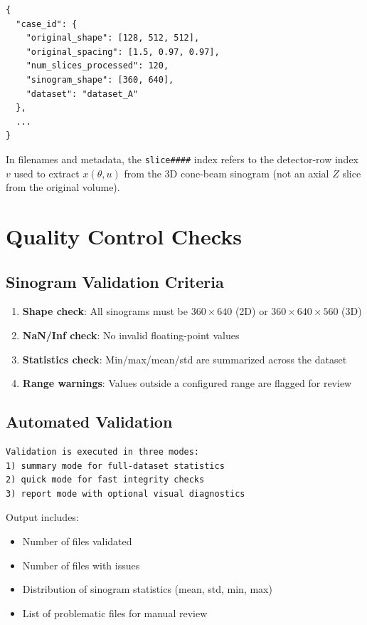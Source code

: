 \begin{verbatim}
{
  "case_id": {
    "original_shape": [128, 512, 512],
    "original_spacing": [1.5, 0.97, 0.97],
    "num_slices_processed": 120,
    "sinogram_shape": [360, 640],
    "dataset": "dataset_A"
  },
  ...
}
\end{verbatim}

In filenames and metadata, the \texttt{slice\#\#\#\#} index refers to the detector-row
index $v$ used to extract $x(\theta, u)$ from the 3D cone-beam sinogram (not an
axial $Z$ slice from the original volume).

\section{Quality Control Checks}

\subsection{Sinogram Validation Criteria}

\begin{enumerate}
    \item \textbf{Shape check}: All sinograms must be $360 \times 640$ (2D) or $360 \times 640 \times 560$ (3D)
    \item \textbf{NaN/Inf check}: No invalid floating-point values
    \item \textbf{Statistics check}: Min/max/mean/std are summarized across the dataset
    \item \textbf{Range warnings}: Values outside a configured range are flagged for review
\end{enumerate}

\subsection{Automated Validation}

\begin{verbatim}
Validation is executed in three modes:
1) summary mode for full-dataset statistics
2) quick mode for fast integrity checks
3) report mode with optional visual diagnostics
\end{verbatim}

Output includes:
\begin{itemize}
    \item Number of files validated
    \item Number of files with issues
    \item Distribution of sinogram statistics (mean, std, min, max)
    \item List of problematic files for manual review
\end{itemize}
